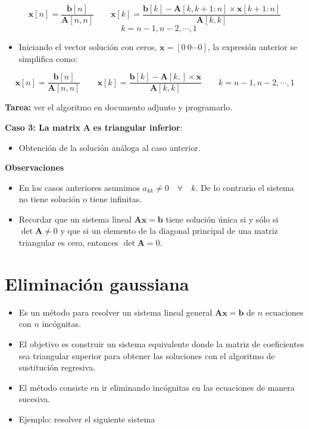 \documentclass[openany]{book}
\providecommand{\tightlist}{%
  \setlength{\itemsep}{0pt}\setlength{\parskip}{0pt}}
\begin{document}
\[
\mathbf{x}[n] = \frac{\mathbf{b}[n]}{\mathbf{A}[n,n]} \qquad \mathbf{x}[k] = \frac{\mathbf{b}[k] - \mathbf{A}[k, k+1 : n] \times \mathbf{x}[k+1 : n]}{\mathbf{A}[k,k]}
\]
\[
\quad k = n-1, n-2, \cdots, 1
\]

\begin{itemize}
\tightlist
\item
  Iniciando el vector solución con ceros, \(\mathbf{x} = [0 ~ 0 \cdots 0]\), la expresión anterior se simplifica como:
\end{itemize}

\[
\mathbf{x}[n] = \frac{\mathbf{b}[n]}{\mathbf{A}[n,n]} \qquad \mathbf{x}[k] = \frac{\mathbf{b}[k] - \mathbf{A}[k, ] \times \mathbf{x}}{\mathbf{A}[k,k]}
\qquad k = n-1, n-2, \cdots, 1
\]

\textbf{Tarea:} ver el algoritmo en documento adjunto y programarlo.

\textbf{Caso 3: La matrix} \(\mathbf{A}\) \textbf{es triangular inferior}:

\begin{itemize}
\tightlist
\item
  Obtención de la solución análoga al caso anterior.
\end{itemize}

\textbf{Observaciones}

\begin{itemize}
\tightlist
\item
  En los casos anteriores asumimos \(a_{kk} \neq 0 \quad \forall \quad k\). De lo contrario el sistema no tiene solución o tiene infinitas.
\item
  Recordar que un sistema lineal \(\mathbf{Ax=b}\) tiene solución única si y sólo si \(\det \mathbf{A} \neq 0\) y que si un elemento de la diagonal principal de una matriz triangular es cero, entonces \(\det \mathbf{A} = 0\).
\end{itemize}

\hypertarget{eliminaciuxf3n-gaussiana}{%
\section{Eliminación gaussiana}\label{eliminaciuxf3n-gaussiana}}

\begin{itemize}
\tightlist
\item
  Es un método para resolver un sistema lineal general \(\mathbf{Ax=b}\) de \(n\) ecuaciones con \(n\) incógnitas.
\item
  El objetivo es construir un sistema equivalente donde la matriz de coeficientes sea triangular superior para obtener las soluciones con el algoritmo de sustitución regresiva.
\item
  El método consiste en ir eliminando incógnitas en las ecuaciones de manera sucesiva.
\item
  Ejemplo: resolver el siguiente sistema
\end{itemize}
\end{document}
